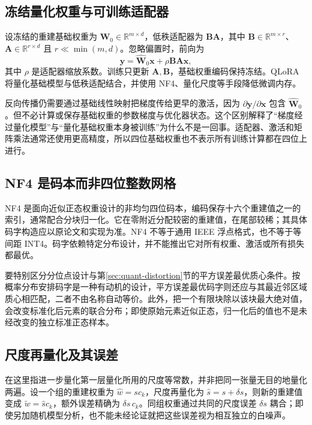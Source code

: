 \documentclass[UTF8,12pt,a4paper,fontset=fandol]{ctexart}
\begin{document}
\subsection{冻结量化权重与可训练适配器}
设冻结的重建基础权重为 $\widehat{\mathbf W}_0\in\mathbb R^{m\times d}$，低秩适配器为 $\mathbf B\mathbf A$，其中 $\mathbf B\in\mathbb R^{m\times r}$、$\mathbf A\in\mathbb R^{r\times d}$ 且 $r\ll\min(m,d)$。忽略偏置时，前向为
\begin{equation}
 \mathbf y=\widehat{\mathbf W}_0\mathbf x+\rho\mathbf B\mathbf A\mathbf x,
 \label{eq:quant-lora}
\end{equation}
其中 $\rho$ 是适配器缩放系数。训练只更新 $\mathbf A,\mathbf B$，基础权重编码保持冻结。QLoRA 将量化基础模型与低秩适配结合，并使用 NF4、量化尺度等手段降低微调内存\cite{dettmers2023}。

反向传播仍需要通过基础线性映射把梯度传给更早的激活，因为 $\partial\mathbf y/\partial\mathbf x$ 包含 $\widehat{\mathbf W}_0$。但不必计算或保存基础权重的参数梯度与优化器状态。这个区别解释了“梯度经过量化模型”与“量化基础权重本身被训练”为什么不是一回事。适配器、激活和矩阵乘法通常还使用更高精度，所以四位基础权重也不表示所有训练计算都在四位上进行。

\subsection{NF4 是码本而非四位整数网格}
NF4 是面向近似正态权重设计的非均匀四位码本，编码保存十六个重建值之一的索引，通常配合分块归一化。它在零附近分配较密的重建值，在尾部较稀；其具体码字构造应以原论文和实现为准。NF4 不等于通用 IEEE 浮点格式，也不等于等间距 INT4。码字依赖特定分布设计，并不能推出它对所有权重、激活或所有损失都最优。

要特别区分分位点设计与第\ref{sec:quant-distortion}节的平方误差最优质心条件。按概率分布安排码字是一种有动机的设计，平方误差最优码字则还应与其最近邻区域质心相匹配，二者不由名称自动等价。此外，把一个有限块除以该块最大绝对值，会改变标准化后元素的联合分布；即使原始元素近似正态，归一化后的值也不是未经改变的独立标准正态样本。

\subsection{尺度再量化及其误差}
在这里指进一步量化第一层量化所用的尺度等常数，并非把同一张量无目的地量化两遍。设一个组的重建权重为 $\widehat w=s c_k$，尺度再量化为 $\widehat s=s+\delta s$，则新的重建值变成 $\widetilde w=\widehat s c_k$，额外误差精确为 $\delta s\,c_k$。同组权重通过共同的尺度误差 $\delta s$ 耦合；即使另加随机模型分析，也不能未经论证就把这些误差视为相互独立的白噪声。
\end{document}
